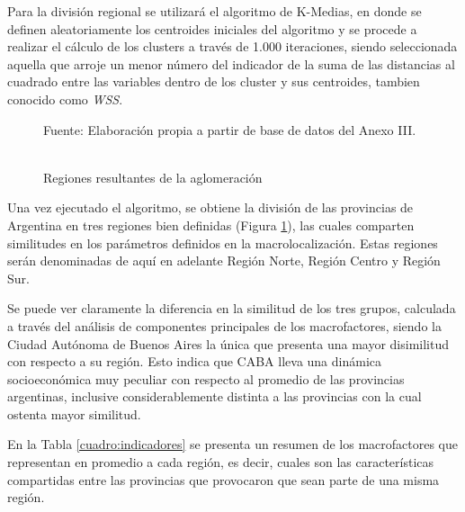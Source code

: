 \documentclass[12pt,a4paper]{article}
\begin{document}
Para la división regional se utilizará el algoritmo de K-Medias, en donde se definen aleatoriamente los centroides iniciales del algoritmo y se procede a realizar el cálculo de los clusters a través de 1.000 iteraciones, siendo seleccionada aquella  que arroje un menor número del indicador de la suma de las distancias al cuadrado entre las variables dentro de  los cluster y sus centroides, tambien conocido como \textit{WSS}.

\begin{figure}[htbp!]
\begin{center}
\caption{\\Regiones resultantes de la aglomeración}

\label{figure:reg_resultantes}
\end{center}
\begin{flushleft}
\begin{scriptsize}
Fuente: Elaboración propia a partir de base de datos del Anexo III.\\
\end{scriptsize}
\end{flushleft}
\end{figure}

Una vez ejecutado el algoritmo, se obtiene la división de las provincias de Argentina en tres regiones bien definidas (Figura \ref{figure:reg_resultantes}), las cuales comparten similitudes en los parámetros definidos en la macrolocalización. Estas regiones serán denominadas de aquí en adelante Región Norte, Región Centro y Región Sur.

Se puede ver claramente la diferencia en la similitud de los tres grupos, calculada a través del análisis de componentes principales de los macrofactores, siendo la Ciudad Autónoma de Buenos Aires la única que presenta una mayor disimilitud con respecto a su región.
Esto indica que CABA  lleva una dinámica socioeconómica muy peculiar con respecto al promedio de las provincias argentinas, inclusive considerablemente distinta a las provincias con la cual ostenta mayor similitud.

En la Tabla \ref{cuadro:indicadores} se presenta un resumen de los macrofactores que representan en promedio a cada región, es decir, cuales son las características compartidas entre las provincias que provocaron que sean parte de una misma región.
\end{document}

